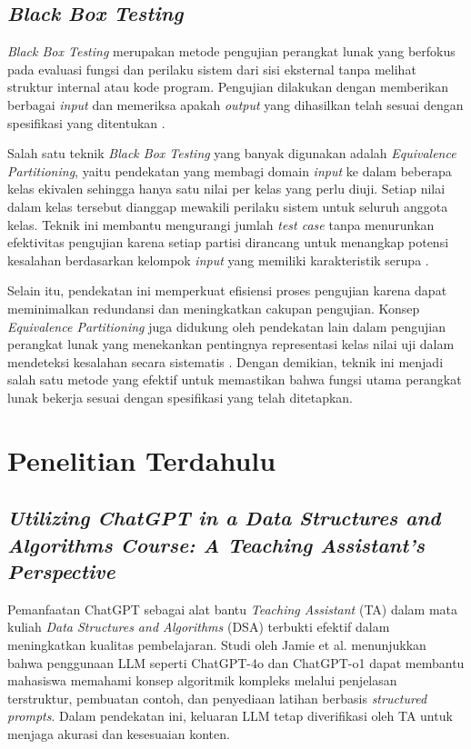 \subsection{\textit{Black Box Testing}}

\textit{Black Box Testing} merupakan metode pengujian perangkat lunak yang berfokus pada evaluasi fungsi dan perilaku sistem dari sisi eksternal tanpa melihat struktur internal atau kode program. Pengujian dilakukan dengan memberikan berbagai \textit{input} dan memeriksa apakah \textit{output} yang dihasilkan telah sesuai dengan spesifikasi yang ditentukan \cite{Pressman2015SWE}.

Salah satu teknik \textit{Black Box Testing} yang banyak digunakan adalah \textit{Equivalence Partitioning}, yaitu pendekatan yang membagi domain \textit{input} ke dalam beberapa kelas ekivalen sehingga hanya satu nilai per kelas yang perlu diuji. Setiap nilai dalam kelas tersebut dianggap mewakili perilaku sistem untuk seluruh anggota kelas. Teknik ini membantu mengurangi jumlah \textit{test case} tanpa menurunkan efektivitas pengujian karena setiap partisi dirancang untuk menangkap potensi kesalahan berdasarkan kelompok \textit{input} yang memiliki karakteristik serupa \cite{Pressman2015SWE}.

Selain itu, pendekatan ini memperkuat efisiensi proses pengujian karena dapat meminimalkan redundansi dan meningkatkan cakupan pengujian. Konsep \textit{Equivalence Partitioning} juga didukung oleh pendekatan lain dalam pengujian perangkat lunak yang menekankan pentingnya representasi kelas nilai uji dalam mendeteksi kesalahan secara sistematis \cite{Myers2011ArtOfSoftwareTesting}. Dengan demikian, teknik ini menjadi salah satu metode yang efektif untuk memastikan bahwa fungsi utama perangkat lunak bekerja sesuai dengan spesifikasi yang telah ditetapkan.


\section{Penelitian Terdahulu}

\subsection{\textit{Utilizing ChatGPT in a Data Structures and Algorithms Course: A Teaching Assistant's Perspective}}

Pemanfaatan ChatGPT sebagai alat bantu \textit{Teaching Assistant} (TA) dalam mata kuliah \textit{Data Structures and Algorithms} (DSA) terbukti efektif dalam meningkatkan kualitas pembelajaran. Studi oleh Jamie et al. \cite{Jamie2024ChatGPTDSA} menunjukkan bahwa penggunaan LLM seperti ChatGPT-4o dan ChatGPT-o1 dapat membantu mahasiswa memahami konsep algoritmik kompleks melalui penjelasan terstruktur, pembuatan contoh, dan penyediaan latihan berbasis \textit{structured prompts}. Dalam pendekatan ini, keluaran LLM tetap diverifikasi oleh TA untuk menjaga akurasi dan kesesuaian konten.

